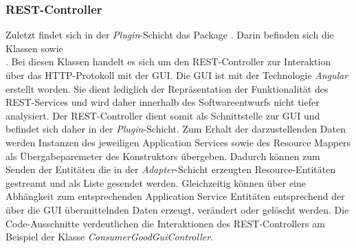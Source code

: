 \subsubsection*{REST-Controller}
Zuletzt findet sich in der \textit{Plugin}-Schicht das Package \href{https://github.com/lucasmerkel/dhbw-advancedswe-programmentwurf/tree/main/swe_programmentwurf/consumergoods-inventory-planner/0-cip-plugins/src/main/java/de/dhbw/cip/plugins/rest}{}.
Darin befinden sich die Klassen \href{https://github.com/lucasmerkel/dhbw-advancedswe-programmentwurf/blob/d5c89113d12c3b877ddc4d6a99225b277ddd468f/swe_programmentwurf/consumergoods-inventory-planner/0-cip-plugins/src/main/java/de/dhbw/cip/plugins/rest/ConsumerGoodsGuiController.java}{} sowie \\\href{https://github.com/lucasmerkel/dhbw-advancedswe-programmentwurf/blob/d5c89113d12c3b877ddc4d6a99225b277ddd468f/swe_programmentwurf/consumergoods-inventory-planner/0-cip-plugins/src/main/java/de/dhbw/cip/plugins/rest/StorageGuiController.java}{}.
Bei diesen Klassen handelt es sich um den \ac{REST}-Controller zur Interaktion über das HTTP-Protokoll mit der \ac{GUI}.
Die GUI ist mit der Technologie \textit{Angular} erstellt worden.
Sie dient lediglich der Repräsentation der Funktionalität des \ac{REST}-Services und wird daher innerhalb des Softwareentwurfs nicht tiefer analysiert.
Der \ac{REST}-Controller dient somit als Schnittstelle zur \ac{GUI} und befindet sich daher in der \textit{Plugin}-Schicht.
Zum Erhalt der darzustellenden Daten werden Instanzen des jeweiligen Application Services sowie des Resource Mappers als Übergabeparemeter des Konstruktors übergeben.
Dadurch können zum Senden der Entitäten die in der \textit{Adapter}-Schicht erzeugten Resource-Entitäten gestreamt und als Liste gesendet werden.
Gleichzeitig können über eine Abhängkeit zum entsprechenden Application Service Entitäten entsprechend der über die \ac{GUI} übermittelnden Daten erzeugt, verändert oder gelöscht werden.
Die Code-Ausschnitte verdeutlichen die Interaktionen des \ac{REST}-Controllers am Beispiel der Klasse \textit{ConsumerGoodGuiController}.

